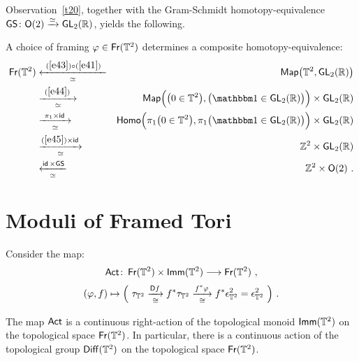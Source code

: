 Observation~\ref{t20}, together with the Gram-Schmidt homotopy-equivalence ${\sf GS}\colon\mathsf O(2) \xrightarrow{\simeq} \operatorname{\sf GL}_2(\mathbb R)$, yields the following.
\begin{cor}
\label{t25}
A choice of framing $\varphi \in \operatorname{\sf Fr}(\mathbb T^2)$ determines a composite homotopy-equivalence:
\begin{eqnarray*}
\Fr(\TT^2) 
&
\underset{\simeq}{
\xla{~(\ref{e43})\circ (\ref{e41})~}
}
&
\Map\bigl( \TT^2 , \GL_2(\RR) \bigr)
\\
\nonumber
&
\underset{\simeq}{
\xra{~(\ref{e44})~}
}
&
\Map \Bigl( \bigl( 0 \in \TT^2 \bigr) , \bigl( \uno \in \GL_2(\RR) \bigr) \Bigr) \times \GL_2(\RR) 
\\
\nonumber
&
\underset{\simeq}{
\xra{~\pi_1 \times \id ~}
}
&
{\sf Homo}\Bigl( \pi_1\bigl( 0 \in \TT^2 \bigr) , \pi_1\bigl( \uno \in \GL_2(\RR) \bigr) \Bigr) \times \GL_2(\RR) 
\\
\nonumber
&
\underset{\simeq}{
\xra{(\ref{e45}) \times \id }
}
&
\ZZ^2 \times \GL_2(\RR)
\\
\nonumber
&
\underset{\simeq}{
\xla{ \id \times {\sf GS}}
}
&
\ZZ^2 \times \sO(2)
~.
\end{eqnarray*}

\end{cor}




















\section{Moduli of Framed Tori}


Consider the map:
\[
\operatorname{\sf Act}\colon
\operatorname{\sf Fr}(\mathbb T^2)
\times
\operatorname{\sf Imm}(\mathbb T^2)
\longrightarrow
\operatorname{\sf Fr}(\mathbb T^2)
~,
\]
\[
( \varphi , f )
\mapsto 
\Bigl(
~
\tau_{\mathbb T^2} 
\underset{\cong}{\xrightarrow{\mathsf D f}}
f^\ast \tau_{\mathbb T^2}
\underset{\cong}{ \xrightarrow{f^\ast \varphi} }
f^\ast \epsilon^2_{\mathbb T^2}
=
\epsilon^2_{\mathbb T^2}
~
\Bigr)
~.
\]

\begin{lemma}
\label{t50}
The map $\operatorname{\sf Act}$ is a continuous right-action of the topological monoid $\operatorname{\sf Imm}(\mathbb T^2)$ on the topological space $\operatorname{\sf Fr}(\mathbb T^2)$.
In particular, there is a continuous action of the topological group $\operatorname{{\sf Diff}}(\mathbb T^2)$ on the topological space $\operatorname{\sf Fr}(\mathbb T^2)$. 

\end{lemma}

